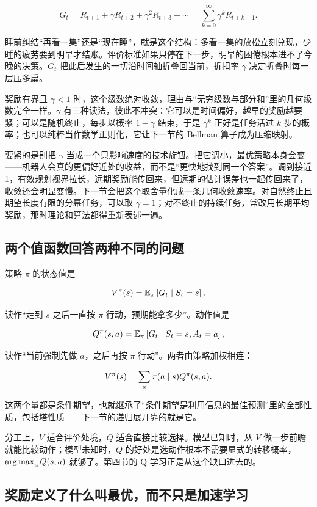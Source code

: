 \[
G_t
=R_{t+1}+\gamma R_{t+2}+\gamma^2R_{t+3}+\cdots
=\sum_{k=0}^{\infty}\gamma^kR_{t+k+1}.
\]

睡前纠结``再看一集''还是``现在睡''，就是这个结构：多看一集的放松立刻兑现，少睡的疲劳要到明早才结账。评价标准如果只停在下一步，明早的困倦根本进不了今晚的决策。\(G_t\) 把此后发生的一切沿时间轴折叠回当前，折扣率 \(\gamma\) 决定折叠时每一层压多扁。

奖励有界且 \(\gamma<1\) 时，这个级数绝对收敛，理由与\hyperref[sec:02-Calculus/05-Sequences-and-Series/02]{``无穷级数与部分和''}里的几何级数完全一样。\(\gamma\) 有三种读法，彼此不冲突：它可以是时间偏好，越早的奖励越要紧；可以是随机终止，每步以概率 \(1-\gamma\) 结束，于是 \(\gamma^k\) 正好是任务活过 \(k\) 步的概率；也可以纯粹当作数学正则化，它让下一节的 Bellman 算子成为压缩映射。

要紧的是别把 \(\gamma\) 当成一个只影响速度的技术旋钮。把它调小，最优策略本身会变——机器人会真的更偏好近处的收益，而不是``更快地找到同一个答案''。调到接近 1，有效规划视界拉长，远期奖励能传回来，但远期的估计误差也一起传回来了，收敛还会明显变慢。下一节会把这个取舍量化成一条几何收敛速率。对自然终止且期望长度有限的分幕任务，可以取 \(\gamma=1\)；对不终止的持续任务，常改用长期平均奖励，那时理论和算法都得重新表述一遍。

\subsection{两个值函数回答两种不同的问题}

策略 \(\pi\) 的状态值是

\[
V^\pi(s)
=
\mathbb{E}_\pi\left[G_t\mid S_t=s\right],
\]

读作``走到 \(s\) 之后一直按 \(\pi\) 行动，预期能拿多少''。动作值是

\[
Q^\pi(s,a)
=
\mathbb{E}_\pi\left[G_t\mid S_t=s,A_t=a\right],
\]

读作``当前强制先做 \(a\)，之后再按 \(\pi\) 行动''。两者由策略加权相连：

\[
V^\pi(s)=\sum_a\pi(a\mid s)Q^\pi(s,a).
\]

这两个量都是条件期望，也就继承了\hyperref[sec:05-Probability/04-Expectation-and-Moments/04]{``条件期望是利用信息的最佳预测''}里的全部性质，包括塔性质——下一节的递归展开靠的就是它。

分工上，\(V\) 适合评价处境，\(Q\) 适合直接比较选择。模型已知时，从 \(V\) 做一步前瞻就能比较动作；模型未知时，\(Q\) 的好处是选动作根本不需要显式的转移概率，\(\operatorname*{arg\,max}_a Q(s,a)\) 就够了。第四节的 Q 学习正是从这个缺口进去的。

\subsection{奖励定义了什么叫最优，而不只是加速学习}

